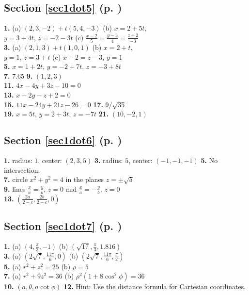 \begin{multicols}{2}
\subsection*{Section \ref{sec1dot5} (p. \pageref{sec1dot5})}
\textbf{1.} (a) $(2,3,-2) + t(5,4,-3)$ \quad (b) $x = 2 + 5t,$\\$y = 3 + 4t, \, z = -2 - 3t$ \quad (c) $\frac{x - 2}{5} =
\frac{y - 3}{4} = \frac{z + 2}{-3}$\\\textbf{3.} (a) $(2,1,3) + t(1,0,1)$ \quad (b) $x = 2 + t,$\\$y = 1, \, z = 3 + t$
\quad (c) $x - 2 = z - 3, \, y = 1$\\\textbf{5.} $x = 1 + 2t, \, y = -2 + 7t, \, z = -3 + 8t$\\\textbf{7.} 7.65 \quad
\textbf{9.} $(1,2,3)$\\\textbf{11.} $4x - 4y + 3z - 10 = 0$\\\textbf{13.} $x - 2y - z + 2 = 0$\\\textbf{15.}
$11x - 24y + 21z - 26 = 0$ \quad \textbf{17.} $9/\sqrt{35}$\\\textbf{19.} $x = 5t$, $y = 2 + 3t$, $z = -7t$
\quad \textbf{21.} $(10,-2,1)$
\subsection*{Section \ref{sec1dot6} (p. \pageref{sec1dot6})}
\textbf{1.} radius: $1$, center: $(2,3,5)$ \quad \textbf{3.} radius: $5$, center: $(-1,-1,-1)$ \quad \textbf{5.} No
intersection.\\\textbf{7.} circle $x^2 + y^2 = 4$ in the planes $z = \pm \sqrt{5}$\\\textbf{9.} lines
$\frac{x}{a} = \frac{y}{b}$, $z = 0$ and $\frac{x}{a} = -\frac{y}{b}$, $z = 0$\\\textbf{13.}
$\left( \frac{2a}{2 - c}, \frac{2b}{2 - c}, 0 \right)$
\subsection*{Section \ref{sec1dot7} (p. \pageref{sec1dot7})}
\textbf{1.} (a) $(4,\frac{\pi}{3},-1)$ \quad (b) $(\sqrt{17},\frac{\pi}{3},1.816)$\\\textbf{3.} (a)
$(2\sqrt{7},\frac{11\pi}{6},0)$ \quad (b) $(2\sqrt{7},\frac{11\pi}{6},\frac{\pi}{2})$\\\textbf{5.} (a) $r^2 + z^2 = 25$
\quad (b) $\rho = 5$\\\textbf{7.} (a) $r^2 + 9z^2 = 36$ \quad (b) $\rho^2 ( 1 + 8 \cos^2 \phi ) = 36$\\
\textbf{10.} $(a,\theta,a \cot \phi )$ \quad \textbf{12.} Hint: Use the distance formula for Cartesian coordinates.


\end{multicols}

